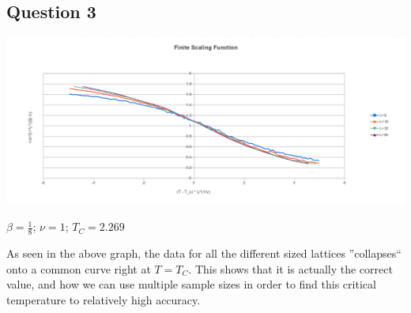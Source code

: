 \documentclass[10pt]{article}
\begin{document}
\subsection*{Question 3}
\begin{center}
\includegraphics[scale=0.5]{finitescalingfunction}

\footnotesize $\beta = \frac{1}{8}$; $\nu = 1$; $T_C = 2.269$
\end{center}

As seen in the above graph, the data for all the different sized lattices ''collapses`` onto a common curve right at $T=T_C$. This shows that it is actually the correct value, and how we can use multiple sample sizes in order to find this critical temperature to relatively high accuracy.  
\end{document}
